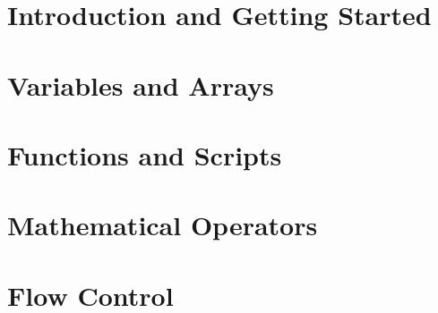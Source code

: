 \documentclass{book}
\author{Samit Basu}
\begin{document}
\maketitle
\setcounter{tocdepth}{1}
\tableofcontents
\chapter{Introduction and Getting Started}

\chapter{Variables and Arrays}







\chapter{Functions and Scripts}











\chapter{Mathematical Operators}
















\chapter{Flow Control}













\end{document}
